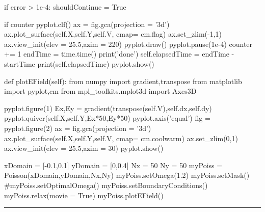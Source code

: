 \begin{codeexample}
\begin{VerbatimOut}{\listingFile}
                    if error > 1e-4:
                        shouldContinue = True

            if counter %
                pyplot.clf()
                ax = fig.gca(projection = '3d')
                ax.plot_surface(self.X,self.Y,self.V, cmap= cm.flag)
                ax.set_zlim(-1,1)
                ax.view_init(elev = 25.5,azim = 220)
                pyplot.draw()
                pyplot.pause(1e-4)
            counter += 1
        endTime = time.time()
        print('done')
        self.elapsedTime = endTime - startTime
        print(self.elapsedTime)
        pyplot.show()

    def plotEField(self):
        from numpy import gradient,transpose
        from matplotlib import pyplot,cm
        from mpl_toolkits.mplot3d import Axes3D

        pyplot.figure(1)
        Ex,Ey = gradient(transpose(self.V),self.dx,self.dy)
        pyplot.quiver(self.X,self.Y,Ex*50,Ey*50)
        pyplot.axis('equal')
        fig = pyplot.figure(2)
        ax = fig.gca(projection = '3d')
        ax.plot_surface(self.X,self.Y,self.V, cmap= cm.coolwarm)
        ax.set_zlim(0,1)
        ax.view_init(elev = 25.5,azim = 30)
        pyplot.show()
                
xDomain = [-0.1,0.1]
yDomain = [0,0.4]
Nx = 50
Ny = 50
myPoiss = Poisson(xDomain,yDomain,Nx,Ny)
myPoiss.setOmega(1.2)
myPoiss.setMask()
#myPoiss.setOptimalOmega()
myPoiss.setBoundaryConditions()
myPoiss.relax(movie = True)
myPoiss.plotEField()

\end{VerbatimOut}
\end{codeexample}
\else
\noindent\rule{5 in}{0.01 in}
\fi
